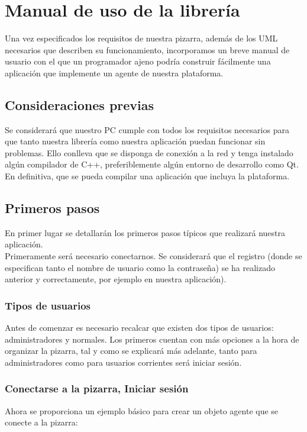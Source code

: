 \chapter{Manual de uso de la librería}
\lettrine[lines=1,slope=4pt,findent=0pt]{U}{}na vez especificados los requisitos de nuestra pizarra, además de los UML necesarios que describen su funcionamiento, incorporamos un breve manual de usuario con el que un programador ajeno podría construir fácilmente una aplicación que implemente un agente de nuestra plataforma.

\section{Consideraciones previas}
Se considerará que nuestro PC cumple con todos los requisitos necesarios para que tanto nuestra librería como nuestra aplicación puedan funcionar sin problemas. Ello conlleva que se disponga de conexión a la red y tenga instalado algún compilador de C++, preferiblemente algún entorno de desarrollo como Qt\cite{QT}. En definitiva, que se pueda compilar una aplicación que incluya la plataforma.

\section{Primeros pasos} \label{sec:puesta}
En primer lugar se detallarán los primeros pasos típicos que realizará nuestra aplicación.\\

Primeramente será necesario conectarnos. Se considerará que el registro (donde se especifican tanto el nombre de usuario como la contraseña) se ha realizado anterior y correctamente, por ejemplo en nuestra aplicación).\\

\subsection{Tipos de usuarios}
Antes de comenzar es necesario recalcar que existen dos tipos de usuarios: administradores y normales. Los primeros cuentan con más opciones a la hora de organizar la pizarra, tal y como se explicará más adelante, tanto para administradores como para usuarios corrientes será iniciar sesión.

\subsection{Conectarse a la pizarra, Iniciar sesión}
Ahora se proporciona un ejemplo básico para crear un objeto agente que se conecte a la pizarra:


